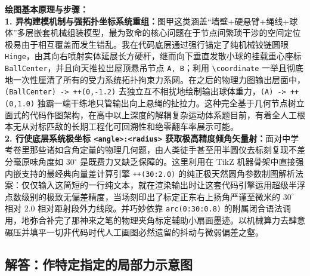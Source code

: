 \vspace{0.6cm}

{\small\color{blue!70!black}
\textbf{绘图基本原理与步骤：}\\
\textbf{1. 异构建模机制与强拓扑坐标系统重组：}图甲这类涵盖“墙壁+硬悬臂+绳线+球体”多层嵌套机械组装模型，最为致命的核心问题在于节点间繁琐干涉的空间定位极易由于相互覆盖而发生错乱。我在代码底层通过强行锚定了纯机械铰链圆眼 \texttt{Hinge}，由其向右喷射实体延展长方硬杆，继而向下垂直发散小球的挂载重心座标 \texttt{BallCenter}，并且向天推拉出屋顶悬吊节点 \texttt{A, B}；利用 \texttt{\textbackslash coordinate} 一举且彻底地一次性厘清了所有的受力系统拓扑拘束力系网。在之后的物理力图输出层面中，\texttt{(BallCenter) -> ++(0,-1.2)} 去独立互不相扰地绘制输出球体重力，\texttt{(A) -> ++(0,1.0)} 独霸一端干练地只管输出向上悬绳的扯拉力。这种完全基于几何节点树立面式的代码作图架构，在高中以上深度的解耦复杂运动体系题目前，有着全人工根本无从对标匹敌的长期工程化可回溯性和绝零翻车率展示可能。\\
\textbf{2. 行使底层系统极坐标 \texttt{<angle>:<radius>} 获取极高精度倾角矢量射：}面对中学考卷里那些诸如含角定量的物理几何题，由人类徒手甚至用半圆仪去标刻复现不差分毫原味角度如 $30^{\circ}$ 是既费力又缺乏保障的。这里利用在 TikZ 机器骨架中直接强内嵌支持的最经典向量差计算引擎 \texttt{++(30:2.0)} 的纯正极天然圆角参数制图解析法案：仅仅输入这简短的一行纯文本，就在渲染输出时让这套代码引擎运用超级半浮点数级别的极致无偏差精度，当场刻印出了标定正东右上扬角严谨至微米的 $30^{\circ}$ 相对 $2.0$ 相对距射段外力线段。并巧妙依靠 \texttt{arc(0:30:0.8)} 的附属闭合语法调用，地弥合补完了那神来之笔的物理夹角标定辅助小扇面墨迹。以机械算力去肆意碾压并填平一切非代码时代人工画图必然遗留的抖动与微弱偏差之壑。
}




\newpage

\subsection{解答：作特定指定的局部力示意图}

\vspace{0.6cm}

